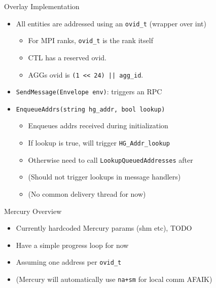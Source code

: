 \documentclass{beamer}
\begin{document}
\begin{frame}{Overlay Implementation}

	\begin{itemize}
		\item All entities are addressed using an \texttt{ovid\_t} (wrapper over int)
		      \begin{itemize}
			      \item For MPI ranks, \texttt{ovid\_t} is the rank itself
			      \item CTL has a reserved ovid.
			      \item AGGs ovid is \texttt{(1 << 24) || agg\_id}.
		      \end{itemize}
		\item \texttt{SendMessage(Envelope env)}: triggers an RPC
		\item \texttt{EnqueueAddrs(string hg\_addr, bool lookup)}
		      \begin{itemize}
            \item Enqueues addrs received during initialization
			      \item If lookup is true, will trigger \texttt{HG\_Addr\_lookup}
			      \item Otherwise need to call \texttt{LookupQueuedAddresses} after
            \item (Should not trigger lookups in message handlers)
            \item (No common delivery thread for now)
		      \end{itemize}
	\end{itemize}

\end{frame}

\begin{frame}{Mercury Overview}
	\begin{itemize}
		\item Currently hardcoded Mercury params (shm etc), TODO
		\item Have a simple progress loop for now
		\item Assuming one address per \texttt{ovid\_t}
		\item (Mercury will automatically use \texttt{na+sm} for local comm AFAIK)
	\end{itemize}
\end{frame}
\end{document}
